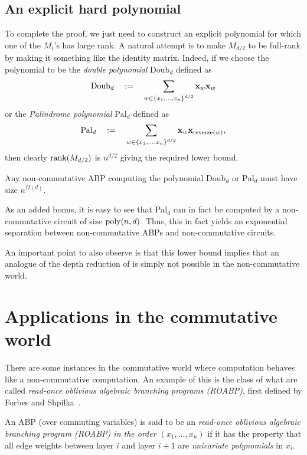 \subsection{An explicit hard polynomial}

To complete the proof, we just need to construct an explicit polynomial for which one of the $M_i$'s has large rank.
A natural attempt is to make $M_{d/2}$ to be full-rank by making it something like the identity matrix.
Indeed, if we choose the polynomial to be the \emph{double polynomial} $\mathrm{Doub}_d$ defined as
\[
\mathrm{Doub}_d \quad := \quad \sum_{w\in \left\{x_1, \ldots, x_n\right\}^{d/2}} \mathbf{x}_{w} \mathbf{x}_w
\]
or the \emph{Palindrome polynomial} $\mathrm{Pal}_d$ defined as
\[
\mathrm{Pal}_d \quad := \quad \sum_{w\in \left\{x_1, \ldots, x_n\right\}^{d/2}} \mathbf{x}_{w} \mathbf{x}_{\mathrm{reverse}(w)},
\]
then clearly $\operatorname{rank}(M_{d/2})$ is $n^{d/2}$ giving the required lower bound. 

\begin{theorem} Any non-commutative ABP computing the polynomial $\mathrm{Doub}_d$ or $\mathrm{Pal}_d$ must have size $n^{\Omega(d)}$. 
\end{theorem}

As an added bonus, it is easy to see that $\mathrm{Pal}_d$ can in fact be computed by a non-commutative circuit of size $\operatorname{poly}(n,d)$.
Thus, this in fact yields an exponential separation between non-commutative ABPs and non-commutative circuits.
 
An important point to also observe is that this lower bound implies that an analogue of the depth reduction of \cite{vsbr83} is simply not possible in the non-commutative world. 

\section{Applications in the commutative world}

There are some instances in the commutative world where computation behaves like a non-commutative computation.
An example of this is the class of what are called \emph{read-once oblivious algebraic branching programs (ROABP)}, first defined by Forbes and Shpilka~\cite{FS13}. 


\begin{definition}
An ABP (over commuting variables) is said to be an \emph{read-once oblivious algebraic branching program (ROABP) in the order $(x_1,\ldots, x_n)$} if it has the property that all edge weights between layer $i$ and layer $i+1$ are \emph{univariate polynomials} in $x_i$.
\end{definition}


